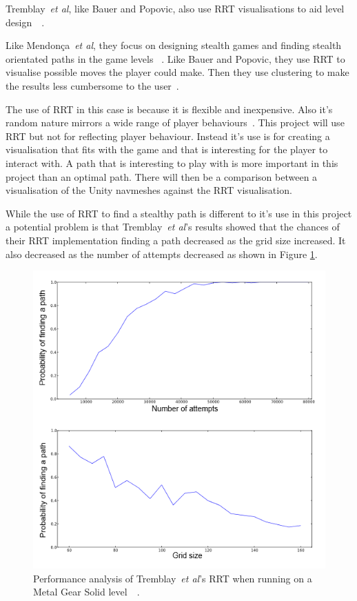 \documentclass[journal]{IEEEtran}
\begin{document}
Tremblay~\textit{et al}, like Bauer and Popovic, also use RRT visualisations to aid level design~\cite{Tremblay2013}~\cite{bauer2012}. 

Like Mendonça~\textit{et al}, they focus on designing stealth games and finding stealth orientated paths in the game levels~\cite{Mendonça2015} \cite{Tremblay2013} . Like Bauer and Popovic, they use RRT to visualise possible moves the player could make. Then they use clustering to make the results less cumbersome to the user~\cite{Tremblay2013}. 

The use of RRT in this case is because it is flexible and inexpensive. Also it's random nature mirrors a wide range of player behaviours~\cite{Tremblay2013}. 
This project will use RRT but not for reflecting player behaviour.  Instead it's use  is for creating a visualisation that fits with the game and that is interesting for the player to interact with. A path that is interesting to play with is more important in this project than an optimal path. There will then be a comparison between a visualisation of the Unity navmeshes against the RRT visualisation.

While the use of RRT to find a stealthy path is different to it's use in this project a potential problem is that Tremblay~\textit{et al}'s results showed that the chances of their RRT implementation finding a path decreased as the grid size increased. It also decreased as the number of attempts decreased as shown in Figure \ref{TremblayRRT}. 


\begin{figure}[h]
	\includegraphics[width=1.0\linewidth]{Tremblay2013.png}
	\caption{ Performance analysis of Tremblay~\textit{et al}'s RRT when running on a Metal Gear Solid level~\cite{Tremblay2013}~\cite{game:MetalGearSolid}.}
	\label{TremblayRRT}
\end{figure} 
\end{document}
